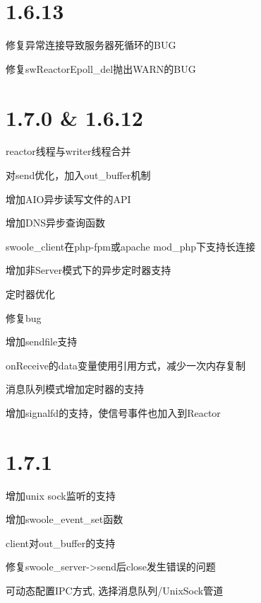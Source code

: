 \section{1.6.13}


\begin{compactitem}
\item 修复异常连接导致服务器死循环的BUG
\item 修复swReactorEpoll\_del抛出WARN的BUG
\end{compactitem}



\section{1.7.0 \& 1.6.12}



\begin{compactitem}
\item reactor线程与writer线程合并
\item 对send优化，加入out\_buffer机制
\item 增加AIO异步读写文件的API
\item 增加DNS异步查询函数
\item swoole\_client在php-fpm或apache mod\_php下支持长连接
\item 增加非Server模式下的异步定时器支持
\item 定时器优化
\item 修复bug
\item 增加sendfile支持
\item onReceive的data变量使用引用方式，减少一次内存复制
\item 消息队列模式增加定时器的支持
\item 增加signalfd的支持，使信号事件也加入到Reactor
\end{compactitem}

\section{1.7.1}

\begin{compactitem}
\item 增加unix sock监听的支持
\item 增加swoole\_event\_set函数
\item client对out\_buffer的支持
\item 修复swoole\_server->send后close发生错误的问题
\item 可动态配置IPC方式, 选择消息队列/UnixSock管道
\end{compactitem}


